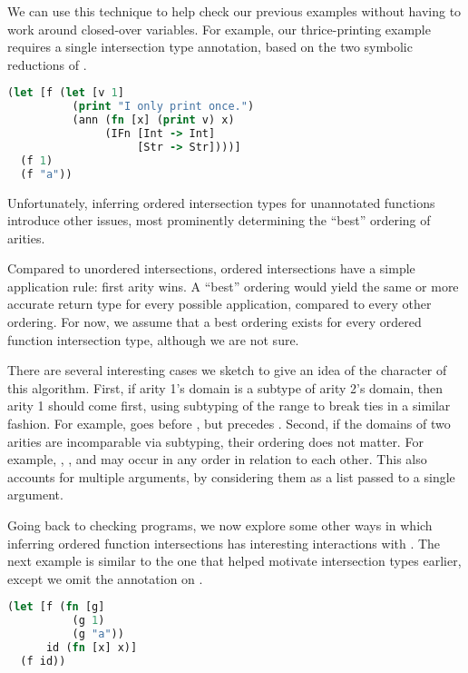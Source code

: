 We can use this technique to help check our previous examples
without having to work around closed-over variables.
For example, our thrice-printing example requires
a single intersection type annotation, based on
the two symbolic reductions of .

\begin{lstlisting}[language=Clojure]
(let [f (let [v 1]
          (print "I only print once.")
          (ann (fn [x] (print v) x)
               (IFn [Int -> Int]
                    [Str -> Str])))]
  (f 1)
  (f "a"))
\end{lstlisting}

Unfortunately, inferring ordered intersection types for unannotated
functions introduce other issues,
most prominently determining the ``best'' ordering of
arities.

Compared to unordered intersections, ordered intersections
have a simple application rule: first arity wins.
A ``best'' ordering would yield the same or more accurate return type
for every possible application, compared to every other ordering.
For now, we assume that a best ordering
exists for every ordered function intersection type, although
we are not sure.

There are several interesting cases we sketch to give an idea
of the character of this algorithm.
First, if arity 1's domain is a subtype of arity 2's
domain, then arity 1 should come first,
using subtyping of the range to break ties in a similar fashion.
For example, 
goes before  ,
but
precedes
.
Second, if the domains of two arities
are incomparable via subtyping, their ordering does not matter.
For example,
,
,
and
may occur in any order in relation to each other.
This also accounts for multiple arguments,
by considering them as a list passed to a single argument.

Going back to checking programs, we now explore some
other ways in which inferring ordered function intersections has
interesting interactions with \ltiFsub.
The next example is similar to the one that helped motivate
intersection types earlier, except we omit the annotation
on .

\begin{lstlisting}[language=Clojure]
(let [f (fn [g]
          (g 1)
          (g "a"))
      id (fn [x] x)]
  (f id))
\end{lstlisting}

